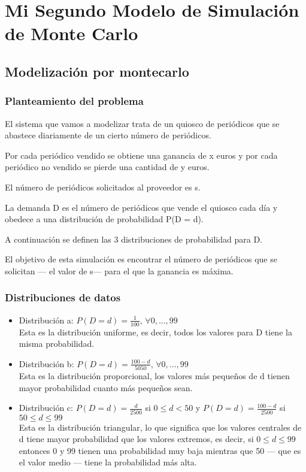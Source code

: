 \chapter{Mi Segundo Modelo de Simulación de Monte Carlo}

\section{Modelización por montecarlo}

\subsection{Planteamiento del problema}
El sistema que vamos a modelizar trata de un quiosco de periódicos que se abastece diariamente de un cierto número de periódicos.

Por cada periódico vendido se obtiene una ganancia de x euros y por cada periódico no vendido se pierde una cantidad de y euros.

El número de periódicos solicitados al proveedor es s.

La demanda D es el número de periódicos que vende el quiosco cada día y obedece a una distribución de probabilidad P(D = d).

A continuación se definen las 3 distribuciones de probabilidad para D.

El objetivo de esta simulación es encontrar el número de periódicos que se solicitan --- el valor de s--- para el que la ganancia es máxima.

\subsection{Distribuciones de datos}

\begin{itemize}
	\item Distribución a: $P(D = d) = \frac{1}{100}$, $\forall 0,...,99$ \\ Esta es la distribución uniforme, es decir, todos los valores para D tiene la misma probabilidad.
	\item Distribución b: $P(D = d) = \frac{100 - d}{5050}$, $\forall 0,...,99$ \\ Esta es la distribución proporcional, los valores más pequeños de d tienen mayor probabilidad cuanto más pequeños sean.
	\item Distribución c: $P(D = d) = \frac{d}{2500}$ si $ 0 \leq d < 50$ y  $P(D = d) = \frac{100-d}{2500}$ si $ 50 \leq d \leq 99$ \\ Esta es la distribución triangular, lo que significa que los valores centrales de d tiene mayor probabilidad que los valores extremos, es decir, si $ 0 \leq d \leq 99$ entonces 0 y 99 tienen una probabilidad muy baja mientras que 50 --- que es el valor medio --- tiene la probabilidad más alta.
\end{itemize}




